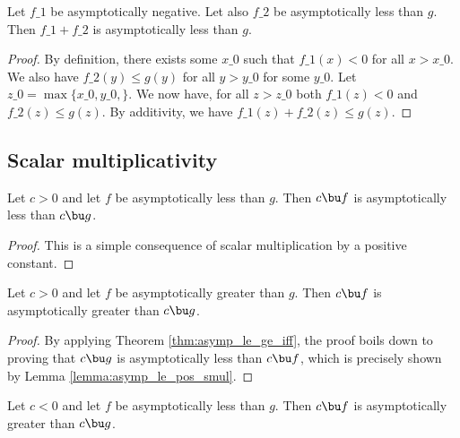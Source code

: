 \begin{lemma}
    \label{lemma:asymp_le_add_neg}
    \leanok
    Let $f\_1$ be asymptotically negative. Let also $f\_2$ be asymptotically less 
    than $g$. Then $f\_1 + f\_2$ is asymptotically less than $g$.
\end{lemma}

\begin{proof}
    \leanok
    By definition, there exists some $x\_0$ such that $f\_1(x) < 0$ for all $x > x\_0$.
    We also have $f\_2(y) \le g(y)$ for all $y > y\_0$ for some $y\_0$. Let
    $z\_0 = \max \{ x\_0, y\_0, \}$. We now have, for all $z > z\_0$ both $f\_1(z) < 0$
    and $f\_2(z) \le g(z)$. By additivity, we have $f\_1(z) + f\_2(z) \le g(z)$. 
\end{proof}


\subsection{Scalar multiplicativity}

\begin{lemma}
    \label{lemma:asymp_le_pos_smul}
    \leanok
    Let $c > 0$ and let $f$ be asymptotically less than $g$. Then $c \bu f$ is asymptotically
    less than $c \bu g$.
\end{lemma}

\begin{proof}
    \leanok
    This is a simple consequence of scalar multiplication by a positive constant.
\end{proof}

\begin{lemma}
    \label{lemma:asymp_ge_pos_smul}
    \leanok
    Let $c > 0$ and let $f$ be asymptotically greater than $g$. Then $c \bu f$ is asymptotically
    greater than $c \bu g$.
\end{lemma}

\begin{proof}
    \leanok
    By applying Theorem \ref{thm:asymp_le_ge_iff}, the proof boils down to proving that
    $c \bu g$ is asymptotically less than $c \bu f$, which is precisely shown
    by Lemma \ref{lemma:asymp_le_pos_smul}.
\end{proof}

\begin{lemma}
    \label{lemma:asymp_le_neg_smul}
    \leanok
    Let $c < 0$ and let $f$ be asymptotically less than $g$. Then $c \bu f$ is asymptotically
    greater than $c \bu g$.
\end{lemma}

